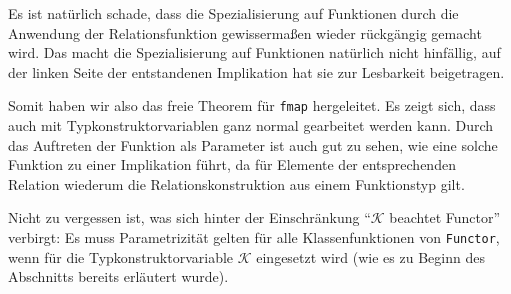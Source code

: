 Es ist natürlich schade, dass die Spezialisierung auf Funktionen durch die Anwendung der Relationsfunktion gewissermaßen wieder
rückgängig gemacht wird.
Das macht die Spezialisierung auf Funktionen natürlich nicht hinfällig, auf der linken Seite der entstandenen Implikation hat
sie zur Lesbarkeit beigetragen.

Somit haben wir also das freie Theorem für \texttt{fmap} hergeleitet. Es zeigt sich, dass auch mit Typkonstruktorvariablen ganz normal
gearbeitet werden kann. Durch das Auftreten der Funktion als Parameter ist auch gut zu sehen, wie eine solche Funktion
zu einer Implikation führt, da für Elemente der entsprechenden Relation wiederum die Relationskonstruktion aus einem Funktionstyp
gilt.

Nicht zu vergessen ist, was sich hinter der Einschränkung ``$\mathcal{K}$ beachtet Functor'' verbirgt: Es muss Parametrizität gelten
für alle Klassenfunktionen von \texttt{Functor}, wenn für die Typkonstruktorvariable $\mathcal{K}$ eingesetzt wird (wie es zu Beginn
des Abschnitts bereits erläutert wurde).
%
%
%
%
%
%
